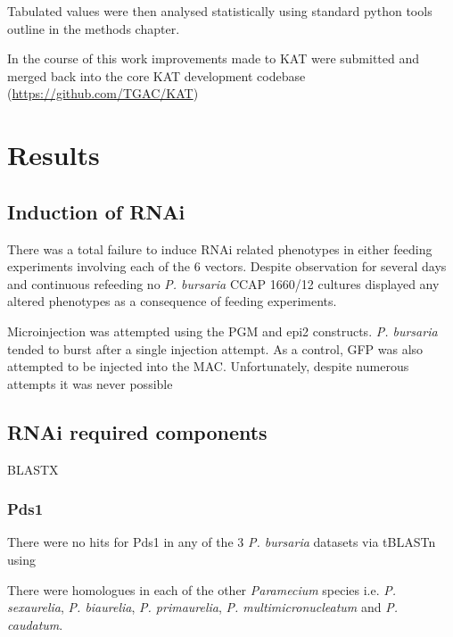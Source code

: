 Tabulated values were then analysed statistically
using standard python tools outline in the methods chapter.

In the course of this work improvements made to KAT were submitted and merged
back into the core KAT development codebase (\url{https://github.com/TGAC/KAT})

\section{Results}

\subsection{Induction of RNAi}

There was a total failure to induce RNAi related phenotypes
in either feeding experiments involving each of the 6 vectors. 
Despite observation for several days and continuous refeeding
no \textit{P. bursaria} CCAP 1660/12 cultures displayed any
altered phenotypes as a consequence of feeding experiments. 

Microinjection was attempted using the PGM and epi2 constructs.
\textit{P. bursaria} tended to burst after a single injection attempt.
As a control, GFP was also attempted to be injected into the MAC.
Unfortunately, despite numerous attempts it was never possible


\subsection{RNAi required components}

BLASTX


\subsubsection{Pds1}

There were no hits for Pds1 in any of the 3 \textit{P. bursaria} datasets via
tBLASTn using 


There were homologues in each of the other \textit{Paramecium} species
i.e. \textit{P. sexaurelia}, \textit{P. biaurelia}, \textit{P. primaurelia},
\textit{P. multimicronucleatum} and \textit{P. caudatum}. 

